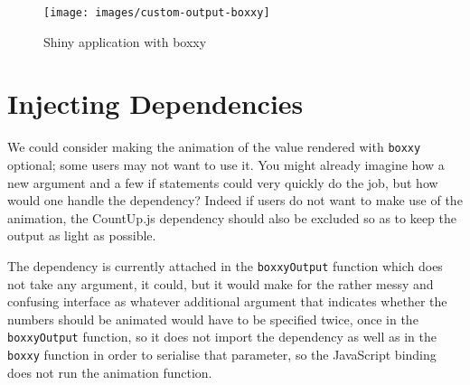 \documentclass[
  10pt,
]{krantz}
\makeatletter
\newenvironment{Shaded}{\begin{snugshade}}{\end{snugshade}}
\newcommand{\CommentTok}[1]{\textcolor[rgb]{0.37,0.37,0.37}{\textit{#1}}}
\newcommand{\ControlFlowTok}[1]{\textcolor[rgb]{0.27,0.27,0.27}{\textbf{#1}}}
\newcommand{\DataTypeTok}[1]{\textcolor[rgb]{0.27,0.27,0.27}{#1}}
\newcommand{\DecValTok}[1]{\textcolor[rgb]{0.06,0.06,0.06}{#1}}
\newcommand{\KeywordTok}[1]{\textcolor[rgb]{0.27,0.27,0.27}{\textbf{#1}}}
\newcommand{\NormalTok}[1]{#1}
\newcommand{\OperatorTok}[1]{\textcolor[rgb]{0.43,0.43,0.43}{\textbf{#1}}}
\newcommand{\OtherTok}[1]{\textcolor[rgb]{0.37,0.37,0.37}{#1}}
\newcommand{\StringTok}[1]{\textcolor[rgb]{0.5,0.5,0.5}{#1}}
\newenvironment{kframe}{%
\medskip{}
\setlength{\fboxsep}{.8em}
 \def\at@end@of@kframe{}%
 \ifinner\ifhmode%
  \def\at@end@of@kframe{\end{minipage}}%
  \begin{minipage}{\columnwidth}%
 \fi\fi%
 \def\FrameCommand##1{\hskip\@totalleftmargin \hskip-\fboxsep
 \colorbox{shadecolor}{##1}\hskip-\fboxsep
     \hskip-\linewidth \hskip-\@totalleftmargin \hskip\columnwidth}%
 \MakeFramed {\advance\hsize-\width
   \@totalleftmargin\z@ \linewidth\hsize
   \@setminipage}}%
 {\par\unskip\endMakeFramed%
 \at@end@of@kframe}
\renewenvironment{Shaded}{\begin{kframe}}{\end{kframe}}
\makeatother
\begin{document}
\begin{figure}[H]

{\centering \texttt{[image: images/custom-output-boxxy]} 

}

\caption{Shiny application with boxxy}\label{fig:boxxy-custom}
\end{figure}

\hypertarget{shiny-output-inject}{%
\section{Injecting Dependencies}\label{shiny-output-inject}}

We could consider making the animation of the value rendered with \texttt{boxxy} optional; some users may not want to use it. You might already imagine how a new argument and a few if statements could very quickly do the job, but how would one handle the dependency? Indeed if users do not want to make use of the animation, the CountUp.js dependency should also be excluded so as to keep the output as light as possible.

The dependency is currently attached in the \texttt{boxxyOutput} function which does not take any argument, it could, but it would make for the rather messy and confusing interface as whatever additional argument that indicates whether the numbers should be animated would have to be specified twice, once in the \texttt{boxxyOutput} function, so it does not import the dependency as well as in the \texttt{boxxy} function in order to serialise that parameter, so the JavaScript binding does not run the animation function.

\begin{Shaded}
\end{Shaded}
\end{document}
